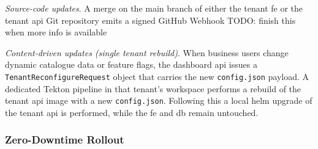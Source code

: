 \documentclass[11pt, a4paper, oneside, listof=totoc]{scrartcl}
\begin{document}
                \begin{enumerate}[label={[\arabic*]:},
                    ref=Challenge~\arabic*,
                    leftmargin=*,
                    itemsep=0.6\baselineskip]

                    \item\label{chal:cdCode}
                        \textit{Source-code updates}.
                        A merge on the main branch of either the tenant \gls{fe} or the tenant
                        \gls{api} Git repository emits a signed GitHub Webhook TODO: finish this
                        when more info is available
                        
                    \item\label{chal:cdData}
                        \textit{Content-driven updates (single tenant rebuild)}.
                        When business users change dynamic catalogue data or feature flags, the
                        dashboard \gls{api} issues a \texttt{TenantReconfigureRequest} object
                        that carries the new \texttt{config.json} payload.  
                        A dedicated Tekton pipeline in that tenant's workspace performs a rebuild of
                        the tenant \gls{api} image with a new \texttt{config.json}.
                        Following this a local helm upgrade of the tenant \gls{api} is performed,
                        while the \gls{fe} and \gls{db} remain untouched.

                \end{enumerate}

                \subsubsection{Zero-Downtime Rollout}\label{subsubsec:zeroDowntime}
\end{document}
